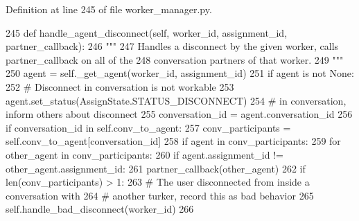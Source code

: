 Definition at line 245 of file worker\+\_\+manager.\+py.


\begin{DoxyCode}
245     \textcolor{keyword}{def }handle\_agent\_disconnect(self, worker\_id, assignment\_id, partner\_callback):
246         \textcolor{stringliteral}{"""}
247 \textcolor{stringliteral}{        Handles a disconnect by the given worker, calls partner\_callback on all of the}
248 \textcolor{stringliteral}{        conversation partners of that worker.}
249 \textcolor{stringliteral}{        """}
250         agent = self.\_get\_agent(worker\_id, assignment\_id)
251         \textcolor{keywordflow}{if} agent \textcolor{keywordflow}{is} \textcolor{keywordflow}{not} \textcolor{keywordtype}{None}:
252             \textcolor{comment}{# Disconnect in conversation is not workable}
253             agent.set\_status(AssignState.STATUS\_DISCONNECT)
254             \textcolor{comment}{# in conversation, inform others about disconnect}
255             conversation\_id = agent.conversation\_id
256             \textcolor{keywordflow}{if} conversation\_id \textcolor{keywordflow}{in} self.conv\_to\_agent:
257                 conv\_participants = self.conv\_to\_agent[conversation\_id]
258                 \textcolor{keywordflow}{if} agent \textcolor{keywordflow}{in} conv\_participants:
259                     \textcolor{keywordflow}{for} other\_agent \textcolor{keywordflow}{in} conv\_participants:
260                         \textcolor{keywordflow}{if} agent.assignment\_id != other\_agent.assignment\_id:
261                             partner\_callback(other\_agent)
262                 \textcolor{keywordflow}{if} len(conv\_participants) > 1:
263                     \textcolor{comment}{# The user disconnected from inside a conversation with}
264                     \textcolor{comment}{# another turker, record this as bad behavior}
265                     self.handle\_bad\_disconnect(worker\_id)
266 
\end{DoxyCode}
\mbox{\label{classparlai_1_1mturk_1_1core_1_1dev_1_1worker__manager_1_1WorkerManager_ae527be446b326d4252304cf89850aff8}} 
